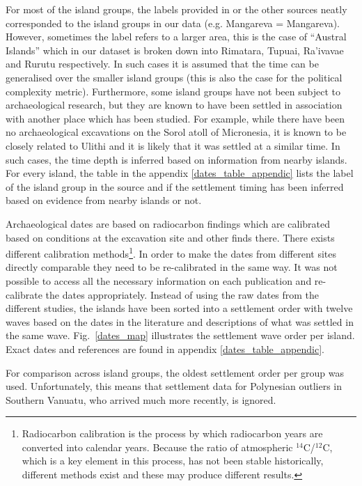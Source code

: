 \documentclass[a4paper,10pt]{article} %
\begin{document}
For most of the island groups, the labels provided in \citet{rieth_cochrane_2018} or the other sources neatly corresponded to the island groups in our data (e.g. Mangareva = Mangareva). However, sometimes the label refers to a larger area, this is the case of ``Austral Islands'' which in our dataset is broken down into Rimatara, Tupuai, Ra'ivavae and Rurutu respectively. In such cases it is assumed that the time can be generalised over the smaller island groups (this is also the case for the political complexity metric). Furthermore, some island groups have not been subject to archaeological research, but they are known to have been settled in association with another place which has been studied. For example, while there have been no archaeological excavations on the Sorol atoll of Micronesia, it is known to be closely related to Ulithi \citep[23]{quackenbush1968sonsorol} and it is likely that it was settled at a similar time. In such cases, the time depth is inferred based on information from nearby islands. For every island, the table in the appendix \ref{dates_table_appendic} lists the label of the island group in the source and if the settlement timing has been inferred based on evidence from nearby islands or not.

Archaeological dates are based on radiocarbon findings which are calibrated based on conditions at the excavation site and other finds there. There exists different calibration methods\footnote{Radiocarbon calibration is the process by which radiocarbon years are converted into calendar years. Because the ratio of atmospheric $^{14}$C/$^{12}$C, which is a key element in this process, has not been stable historically, different methods exist and these may produce different results.}. In order to make the dates from different sites directly comparable they need to be re-calibrated in the same way. It was not possible to access all the necessary information on each publication and re-calibrate the dates appropriately. Instead of using the raw dates from the different studies, the islands have been sorted into a settlement order with twelve waves based on the dates in the literature and descriptions of what was settled in the same wave. Fig.~\ref{dates_map} illustrates the settlement wave order per island. Exact dates and references are found in appendix \ref{dates_table_appendic}.

For comparison across island groups, the oldest settlement order per group was used. Unfortunately, this means that settlement data for Polynesian outliers in Southern Vanuatu, who arrived much more recently, is ignored.
\end{document}
